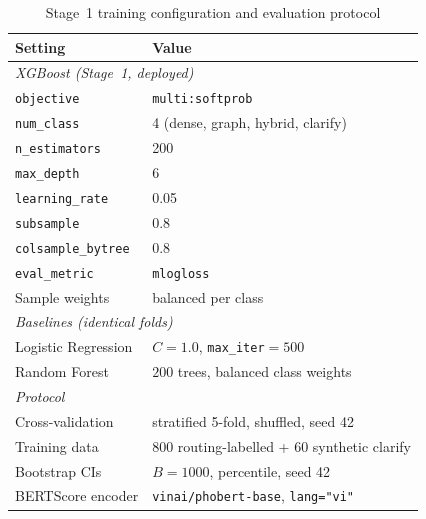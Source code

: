 \documentclass[pdflatex,sn-mathphys-num]{sn-jnl}
\begin{document}
\begin{table}[!htbp]
\centering
\caption{Stage~1 training configuration and evaluation
protocol}\label{tab:hyperparams}
\footnotesize
\begin{tabular}{ll}
\toprule
\textbf{Setting} & \textbf{Value} \\
\midrule
\multicolumn{2}{l}{\emph{XGBoost (Stage~1, deployed)}}\\
\texttt{objective} & \texttt{multi:softprob} \\
\texttt{num\_class} & 4 (dense, graph, hybrid, clarify) \\
\texttt{n\_estimators} & 200 \\
\texttt{max\_depth} & 6 \\
\texttt{learning\_rate} & 0.05 \\
\texttt{subsample} & 0.8 \\
\texttt{colsample\_bytree} & 0.8 \\
\texttt{eval\_metric} & \texttt{mlogloss} \\
Sample weights & balanced per class \\
\midrule
\multicolumn{2}{l}{\emph{Baselines (identical folds)}}\\
Logistic Regression & $C=1.0$, \texttt{max\_iter}$=500$ \\
Random Forest & $200$ trees, balanced class weights \\
\midrule
\multicolumn{2}{l}{\emph{Protocol}}\\
Cross-validation & stratified 5-fold, shuffled, seed 42 \\
Training data & $800$ routing-labelled + $60$ synthetic clarify \\
Bootstrap CIs & $B=1000$, percentile, seed 42 \\
BERTScore encoder & \texttt{vinai/phobert-base}, \texttt{lang="vi"} \\
\bottomrule
\end{tabular}
\end{table}



\end{document}
